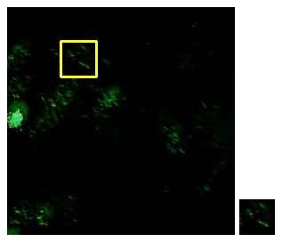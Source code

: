 \documentclass[UTF8]{ctexart}
\begin{document}
\begin{figure}[H]
{\begin{minipage}[b]{0.15\linewidth}
            \includegraphics[width=1\linewidth]{../log/spoon2/cut2/LC81620432014072LGN00_16329_spectral.jpg}\vspace{4pt}
            \includegraphics[width=1\linewidth]{../log/spoon2/cut2/tmp_cut_LC81620432014072LGN00_16329_spectral.jpg}\vspace{4pt}

\end{minipage}}
\end{figure}
\end{document}

